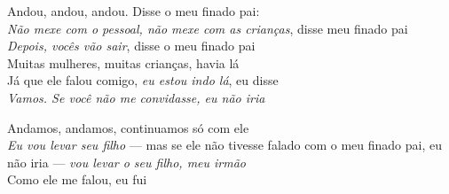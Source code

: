 \begin{linenumbers}\begingroup\raggedright
 
\noindent   Andou, andou, andou. Disse o meu finado pai:\\
  \textit{Não mexe com o pessoal, não mexe com as crianças}, disse meu finado pai\\
  \textit{Depois, vocês vão sair}, disse o meu finado pai\\
  Muitas mulheres, muitas crianças, havia lá\\
  Já que ele falou comigo, \textit{eu estou indo lá}, eu disse\\
  \textit{Vamos. Se você não me convidasse, eu não iria}
 
\end{linenumbers}\endgroup

\bigskip

\begin{linenumbers}\begingroup\raggedright
 
\noindent   Andamos, andamos, continuamos só com ele\\
  \textit{Eu vou levar seu filho} --- mas se ele não tivesse falado com o meu finado pai, eu não iria --- \textit{vou levar o seu filho, meu irmão}\\
  Como ele me falou, eu fui
 
\end{linenumbers}\endgroup

\bigskip

